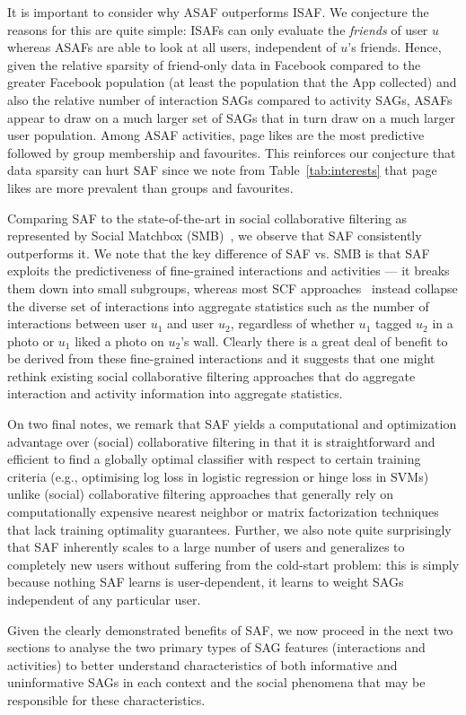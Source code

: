 It is important to consider why ASAF outperforms ISAF.  We conjecture
the reasons for this are quite simple: ISAFs can only evaluate the
\emph{friends} of user $u$ whereas ASAFs are able to look at all
users, independent of $u$'s friends.  Hence, given the relative
sparsity of friend-only data in Facebook compared to the greater
Facebook population (at least the population that the App collected)
and also the relative number of interaction SAGs compared to
activity SAGs, ASAFs appear to draw on a much larger set of SAGs that
in turn draw on a much larger user population.  Among ASAF activities,
page likes are the most predictive followed by group membership and
favourites.  This reinforces our conjecture that data sparsity 
can hurt SAF since we note from Table~\ref{tab:interests} that page likes are
more prevalent than groups and favourites.

Comparing SAF to the state-of-the-art in social collaborative
filtering as represented by Social Matchbox (SMB)~\cite{Noel2012NOF},
we observe that SAF consistently outperforms it.  We note that the key
difference of SAF vs. SMB is that SAF exploits the predictiveness of
fine-grained interactions and activities --- it breaks them down into
small subgroups, whereas most SCF
approaches~\cite{socinf,rrmf,ste,sorec,sr,Noel2012NOF,lla} instead
collapse the diverse set of interactions into aggregate statistics
such as the number of interactions between user $u_1$ and user $u_2$,
regardless of whether $u_1$ tagged $u_2$ in a photo or $u_1$ liked a
photo on $u_2$'s wall.  Clearly there is a great deal of benefit to be
derived from these fine-grained interactions and it suggests that one
might rethink existing social collaborative filtering approaches that
do aggregate interaction and activity information into aggregate
statistics.

On two final notes, we remark that SAF yields a computational and
optimization advantage over (social) collaborative filtering in that
it is straightforward and efficient to find a globally optimal
classifier with respect to certain training criteria (e.g., optimising
log loss in logistic regression or hinge loss in SVMs) unlike (social)
collaborative filtering approaches that generally rely on
computationally expensive nearest neighbor or matrix factorization
techniques that lack training optimality guarantees.  Further, we also
note quite surprisingly that SAF inherently scales to a large number
of users and generalizes to completely new users without suffering
from the cold-start problem: this is simply because nothing SAF learns
is user-dependent, it learns to weight SAGs independent of any
particular user.

Given the clearly demonstrated benefits of SAF, we now proceed in the
next two sections to analyse the two primary types of SAG features
(interactions and activities) to better understand characteristics of
both informative and uninformative SAGs in each context and the social
phenomena that may be responsible for these characteristics.
